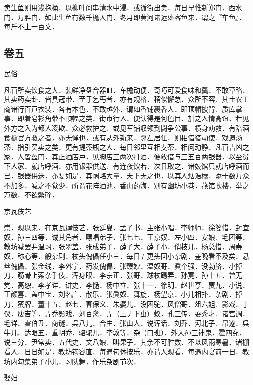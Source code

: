 \documentclass[]{article}
\begin{document}
卖生鱼则用浅抱桶．以柳叶间串清水中浸．或循街出卖．毎日早惟新郑门．西水门．万胜门．如此生鱼有数千檐入门．冬月即黄河诸远处客鱼来．谓之『车鱼』．毎斤不上一百文．

\hypertarget{header-n100}{%
\subsection{卷五}\label{header-n100}}

民俗

凡百所卖饮食之人．装鲜净盘合器皿．车檐动便．奇巧可爱食味和羹．不敢草略．其卖药卖卦．皆具冠带．至于乞丐者．亦有规格．稍似懈怠．众所不容．其土农工商诸行百戸衣装．各有本色．不敢越外．谓如香铺裹香人．即顶帽披背．质库掌事．即着皂衫角带不顶幅之类．街市行人．便认得是何色目．加之人情高谊．若见外方之入为都人凌欺．众必救护之．或见军铺収领到闘争公事．横身劝救．有陪酒食檐官方救之者．亦无惮也．或有从外新来．邻左居住．则相借徣动使．戏遗汤茶．指引买卖之类．更有提茶瓶之人．毎日邻里互相支茶．相问动静．凡百吉凶之家．人皆盈门．其正酒店戸．见脚店三两次打酒．便敢借与三五百两银器．以至贫下人家．就店呼酒．亦用银器供送．有连夜饮若．次日取之．诸妓馆只就店呼酒而已．银器供送．亦复如是．其阔略大量．天下无之也．以其人烟浩穰．添十数万众不加多．减之不觉少．所谓花阵酒池．香山药海．别有幽坊小巷．燕馆歌楼．举之万数．不欲繁碎．

京瓦伎艺

崇．观以来．在京瓦肆伎艺．张廷叟．孟子书．主张小唱．李师师．徐婆惜．封宜奴．孙三四等．诚其角者．嘌唱弟子．张七七．王京奴．左小四．安娘．毛团等．教坊减罢并温习．张翠盖．张成弟子．薛子大．薛子小．俏枝儿．杨总惜．周寿奴．称心等．般杂剧．杖头傀儡任小三．毎日五更头回小杂剧．差晩看不及矣．悬丝傀儡．张金线．李外宁．药发傀儡．张臻妙．温奴哥．眞个强．没勃脐．小掉刀．筋骨上索杂手伎．浑身眼．李宗正．张哥．球杖踢弄．孙寛．孙十五．曾无党．高恕．李孝详．讲史．李慥．杨中立．张十一．徐明．赵世亨．贾九．小说．王颜喜．盖中宝．刘名广．散乐．张眞奴．舞旋．杨望京．小儿相扑．杂剧．掉刀．蛮牌．董十五．赵七．曹保义．朱婆儿．没困驼．风僧哥．俎六姐．影戏．丁仪．痩吉等．弄乔影戏．刘百禽．弄（上丿下虫）蚁．孔三传．耍秀才．诸宫调．毛详．霍伯丑．商谜．呉八儿．合生．张山人．说诨话．刘乔．河北子．帛遂．呉牛儿．达眼五．重明乔．骆驼儿．李敦等．杂（口班）．外入孙三神鬼．霍四究．说三分．尹常卖．五代史．文八娘．叫果子．其余不可胜数．不以风雨寒暑．诸棚看人．日日如是．教坊钧容直．毎遇旬休按乐．亦请人观看．毎遇内宴前一日．教坊内勾集弟子小儿．习队舞．作乐杂剧节次．

娶妇
\end{document}

